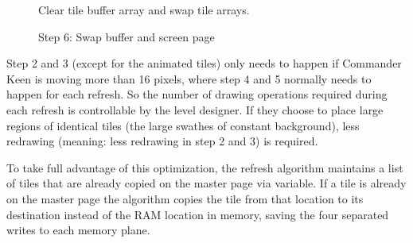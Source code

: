 \documentclass[book.tex]{subfiles}
\begin{document}
\begin{figure}[H]
\centering
 \caption{Clear tile buffer array and swap tile arrays.}
 \label{fig:kc1_3_tile_final}
\end{figure}


\pagebreak

\begin{figure}[H]
\centering
 \caption{Step 6: Swap buffer and screen page}
 \label{fig:kc1_3_update_final}
\end{figure}

Step 2 and 3 (except for the animated tiles) only needs to happen if Commander Keen is moving more than 16 pixels, where step 4 and 5 normally needs to happen for each refresh.
So the number of drawing operations required during each refresh is controllable by the level designer. If they choose to place large regions of identical tiles (the large swathes of constant background), less redrawing (meaning: less redrawing in step 2 and 3) is required.

\pagebreak

To take full advantage of this optimization, the refresh algorithm maintains a list of tiles that are already copied on the master page via  variable. If a tile is already on the master page the algorithm copies the tile from that location to its destination instead of the RAM location in memory, saving the four separated writes to each memory plane.\\
\end{document}
